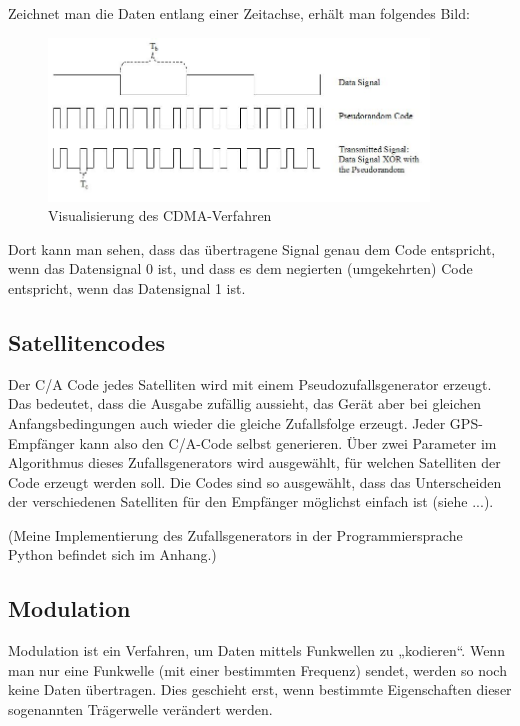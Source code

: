 \documentclass[12pt,a4paper]{scrartcl}
\begin{document}
Zeichnet man die Daten entlang einer Zeitachse, erhält man folgendes Bild:

\begin{figure}[H]
\centering
\includegraphics[width=0.9\textwidth]{img/Generation_of_CDMA.jpg}
\caption{Visualisierung des CDMA-Verfahren\cite{commons_cdma}}
\label{fig:cdma}
\end{figure}

Dort kann man sehen, dass das übertragene Signal genau dem Code entspricht, wenn das Datensignal 0 ist, und dass es dem negierten (umgekehrten) Code entspricht, wenn das Datensignal 1 ist.

\subsection{Satellitencodes}

Der C/A Code jedes Satelliten wird mit einem Pseudozufallsgenerator erzeugt. Das bedeutet, dass die Ausgabe zufällig aussieht, das Gerät aber bei gleichen Anfangsbedingungen auch wieder die gleiche Zufallsfolge erzeugt. Jeder GPS-Empfänger kann also den C/A-Code selbst generieren. Über zwei Parameter im Algorithmus dieses Zufallsgenerators wird ausgewählt, für welchen Satelliten der Code erzeugt werden soll. Die Codes sind so ausgewählt, dass das Unterscheiden der verschiedenen Satelliten für den Empfänger möglichst einfach ist (siehe ...).

(Meine Implementierung des Zufallsgenerators in der Programmiersprache Python befindet sich im Anhang.)

\subsection{Modulation}

Modulation ist ein Verfahren, um Daten mittels Funkwellen zu „kodieren“.
Wenn man nur eine Funkwelle (mit einer bestimmten Frequenz) sendet, werden so noch keine Daten übertragen. Dies geschieht erst, wenn bestimmte Eigenschaften dieser sogenannten Trägerwelle verändert werden.
\end{document}
